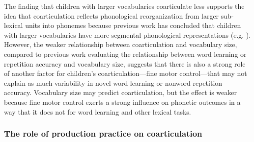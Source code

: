 \documentclass[a4paper,man,natbib,donotrepeattitle, apacite]{apa6}
\begin{document}
The finding that children with larger vocabularies coarticulate less supports the idea that coarticulation reflects phonological reorganization from larger sub-lexical units into phonemes because previous work has concluded that children with larger vocabularies have more segmental phonological representations (e.g. ). However, the weaker relationship between coarticulation and vocabulary size, compared to previous work evaluating the relationship between word learning or repetition accuracy and vocabulary size, suggests that there is also a strong role of another factor for children’s coarticulation---fine motor control---that may not explain as much variability in novel word learning or nonword repetition accuracy. Vocabulary size may predict coarticulation, but the effect is weaker because fine motor control exerts a strong influence on phonetic outcomes \cite{barbierWhatAnticipatoryCoarticulation2020} in a way that it does not for word learning and other lexical tasks.

\subsubsection{The role of production practice on coarticulation}
\end{document}
